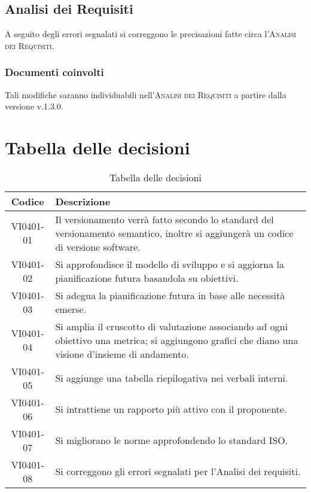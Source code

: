 \documentclass{article}
\begin{document}
\subsection{Analisi dei Requisiti}
\label{itm:8}

A seguito degli errori segnalati si correggono le precisazioni fatte circa l'\textsc{Analisi dei Requisiti}.
\subsubsection*{Documenti coinvolti}
Tali modifiche saranno individuabili nell'\textsc{Analisi dei Requisiti} a partire dalla versione v.1.3.0.

\newpage
\section{Tabella delle decisioni}%
\label{sub:decisioni}

\begin{table}[!ht]
	\centering
	\begin{tabular}{|c|p{13cm}|}
		\hline
		\rowcolor{lightgray}
		\textbf{Codice} & \textbf{Descrizione} \\
		\hline
			VI0401-01 & Il versionamento verrà fatto secondo lo standard del versionamento semantico, inoltre si aggiungerà un codice di versione software. \\
			VI0401-02 & Si approfondisce il modello di sviluppo e si aggiorna la pianificazione futura basandola su obiettivi. \\
            VI0401-03 & Si adegua la pianificazione futura in base alle necessità emerse. \\
            VI0401-04 & Si amplia il cruscotto di valutazione associando ad ogni obiettivo una metrica; si aggiungono grafici che diano una visione d'insieme di andamento. \\
            VI0401-05 & Si aggiunge una tabella riepilogativa nei verbali interni. \\
            VI0401-06 & Si intrattiene un rapporto più attivo con il proponente. \\
            VI0401-07 & Si migliorano le norme approfondendo lo standard ISO. \\
            VI0401-08 & Si correggono gli errori segnalati per l'Analisi dei requisiti.  \\
		\hline
	\end{tabular}
	\caption{Tabella delle decisioni}
\end{table}
\end{document}
